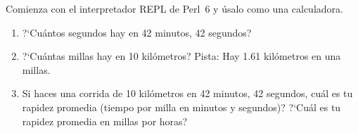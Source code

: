 \begin{exercise}

Comienza con el interpretador REPL de Perl~6 y úsalo como una calculadora.

\begin{enumerate}

\item ?`Cuántos segundos hay en 42 minutos, 42 segundos?

\item ?`Cuántas millas hay en 10  kilómetros? Pista: Hay 1.61
  kilómetros en una millas.

\item Si haces una corrida de 10 kilómetros en 42 minutos, 42 segundos,
 cuál es tu rapidez promedia (tiempo por milla en minutos y segundos)? 
 ?`Cuál es tu rapidez promedia en millas por horas?


\end{enumerate}

\end{exercise}


